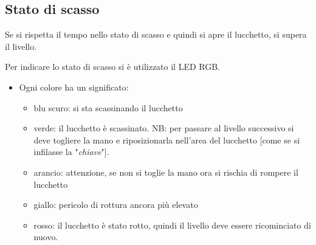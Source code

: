 \subsection{Stato di scasso}
Se si rispetta il tempo nello stato di scasso e quindi si apre il lucchetto, si supera il livello.

Per indicare lo stato di scasso si è utilizzato il LED RGB. 
\begin{itemize}
	\item Ogni colore ha un significato:
	\begin{itemize}
		\item blu scuro: si sta scassinando il lucchetto
		\item verde: il lucchetto è scassinato.
			\subitem NB: per passare al livello successivo si deve togliere la mano e riposizionarla nell'area del lucchetto [come se si infilasse la "\textit{chiave}"].
		\item arancio: attenzione, se non si toglie la mano ora si rischia di rompere il lucchetto
		\item giallo: pericolo di rottura ancora più elevato
		\item rosso: il lucchetto è stato rotto, quindi il livello deve essere ricominciato di nuovo.
	\end{itemize}
\end{itemize}